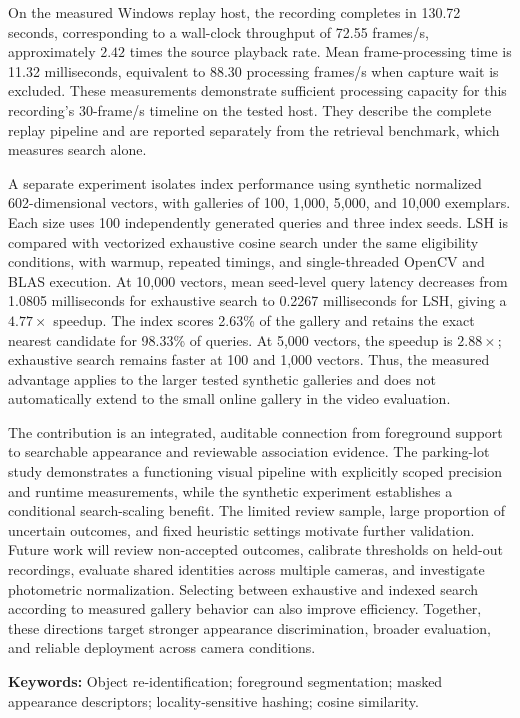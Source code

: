 \documentclass[11pt,a4paper]{article}
\begin{document}
On the measured Windows replay host, the recording completes in 130.72 seconds, corresponding to a wall-clock throughput of 72.55 frames/s, approximately $2.42$ times the source playback rate. Mean frame-processing time is 11.32 milliseconds, equivalent to 88.30 processing frames/s when capture wait is excluded. These measurements demonstrate sufficient processing capacity for this recording's 30-frame/s timeline on the tested host. They describe the complete replay pipeline and are reported separately from the retrieval benchmark, which measures search alone.

A separate experiment isolates index performance using synthetic normalized 602-dimensional vectors, with galleries of 100, 1,000, 5,000, and 10,000 exemplars. Each size uses 100 independently generated queries and three index seeds. LSH is compared with vectorized exhaustive cosine search under the same eligibility conditions, with warmup, repeated timings, and single-threaded OpenCV and BLAS execution. At 10,000 vectors, mean seed-level query latency decreases from 1.0805 milliseconds for exhaustive search to 0.2267 milliseconds for LSH, giving a $4.77\times$ speedup. The index scores 2.63\% of the gallery and retains the exact nearest candidate for 98.33\% of queries. At 5,000 vectors, the speedup is $2.88\times$; exhaustive search remains faster at 100 and 1,000 vectors. Thus, the measured advantage applies to the larger tested synthetic galleries and does not automatically extend to the small online gallery in the video evaluation.

The contribution is an integrated, auditable connection from foreground support to searchable appearance and reviewable association evidence. The parking-lot study demonstrates a functioning visual pipeline with explicitly scoped precision and runtime measurements, while the synthetic experiment establishes a conditional search-scaling benefit. The limited review sample, large proportion of uncertain outcomes, and fixed heuristic settings motivate further validation. Future work will review non-accepted outcomes, calibrate thresholds on held-out recordings, evaluate shared identities across multiple cameras, and investigate photometric normalization. Selecting between exhaustive and indexed search according to measured gallery behavior can also improve efficiency. Together, these directions target stronger appearance discrimination, broader evaluation, and reliable deployment across camera conditions.

\vspace{0.3em}
{\small\textbf{Keywords:} Object re-identification; foreground segmentation; masked appearance descriptors; locality-sensitive hashing; cosine similarity.}
\end{document}
